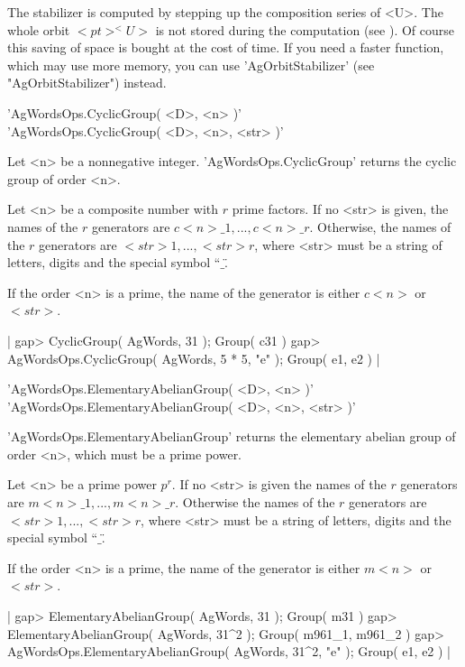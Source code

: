 The stabilizer is computed by  stepping up the composition series of <U>.
The  whole orbit $<pt>^<U>$ is  not stored  during  the  computation (see
\cite{LNS84}).  Of course this saving  of space is bought at  the cost of
time.  If you need a  faster function, which may use more memory, you can
use 'AgOrbitStabilizer' (see "AgOrbitStabilizer") instead.


'AgWordsOps.CyclicGroup( <D>, <n> )' \\
'AgWordsOps.CyclicGroup( <D>, <n>, <str> )'

Let <n> be  a  nonnegative integer.  'AgWordsOps.CyclicGroup' returns the
cyclic group of order <n>.

Let  <n> be a  composite number with  $r$ prime factors.   If no <str> is
given,  the  names of the  $r$  generators  are  $c<n>\_1, ..., c<n>\_r$.
Otherwise,  the  names of the $r$  generators are $<str>1, ...,  <str>r$,
where <str>  must be a  string of letters, digits  and the special symbol
``$\_$\".

If the order <n> is a prime,  the name of the  generator is either $c<n>$
or $<str>$.

|    gap> CyclicGroup( AgWords, 31 );
    Group( c31 )
    gap> AgWordsOps.CyclicGroup( AgWords, 5 * 5, "e" );
    Group( e1, e2 ) |


'AgWordsOps.ElementaryAbelianGroup( <D>, <n> )' \\
'AgWordsOps.ElementaryAbelianGroup( <D>, <n>, <str> )'

'AgWordsOps.ElementaryAbelianGroup'  returns the elementary abelian group
of order <n>, which must be a prime power.

Let <n> be a prime power $p^r$.  If  no <str>  is given  the names of the
$r$ generators are $m<n>\_1, ..., m<n>\_r$.  Otherwise  the  names of the
$r$ generators are $<str>1, ..., <str>r$, where <str> must be a string of
letters, digits and the special symbol ``$\_$\".

If the order  <n> is a prime,  the name of the generator is either $m<n>$
or $<str>$.

|    gap> ElementaryAbelianGroup( AgWords, 31 );
    Group( m31 )
    gap> ElementaryAbelianGroup( AgWords, 31^2 );
    Group( m961_1, m961_2 )
    gap> AgWordsOps.ElementaryAbelianGroup( AgWords, 31^2, "e" );
    Group( e1, e2 ) |

